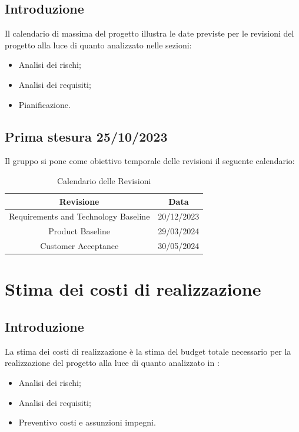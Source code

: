 \documentclass{article}
\begin{document}
\subsection{Introduzione}
Il calendario di massima del progetto illustra le date previste per le revisioni del progetto
alla luce di quanto analizzato nelle sezioni:
\begin{itemize}
    \item Analisi dei rischi;
    \item Analisi dei requisiti;
    \item Pianificazione.
\end{itemize}
\subsection{Prima stesura 25/10/2023}
Il gruppo si pone come obiettivo temporale delle revisioni il seguente calendario:
\begin{table}[ht]
    \centering
    \begin{tabular}{|c|c|}
        \hline
        \textbf{Revisione}                   & \textbf{Data} \\
        \hline
        Requirements and Technology Baseline & 20/12/2023    \\
        Product Baseline                     & 29/03/2024    \\
        Customer Acceptance                  & 30/05/2024    \\
        \hline
    \end{tabular}
    \caption{Calendario delle Revisioni}
\end{table}
\section{Stima dei costi di realizzazione}
\subsection{Introduzione}
La stima dei costi di realizzazione è la stima del budget totale necessario per la realizzazione del progetto alla luce di quanto analizzato in :
\begin{itemize}
    \item Analisi dei rischi;
    \item Analisi dei requisiti;
    \item Preventivo costi e assunzioni impegni.
\end{itemize}
\end{document}
